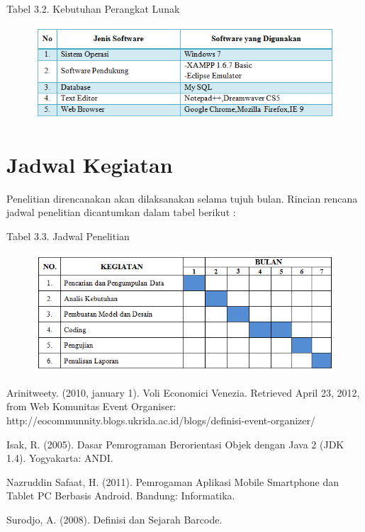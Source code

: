 \documentclass{jtetiproposalskripsi}
\begin{document}
\begin{center}
Tabel 3.2. Kebutuhan Perangkat Lunak
\end{center}
\vspace{-0.5cm}
\begin{figure}[ht!]
  \centering
    \includegraphics{gambar/software}
    \label{software}
\end{figure}

\section{Jadwal Kegiatan}
Penelitian direncanakan akan dilaksanakan selama tujuh bulan. Rincian rencana jadwal penelitian dicantumkan dalam tabel berikut :

\begin{center}
Tabel 3.3. Jadwal Penelitian
\end{center}
\vspace{-0.5cm}
\begin{figure}[ht!]
  \centering
    \includegraphics{gambar/jadwal}
    \label{jadwal}
\end{figure}


\begin{thebibliography}{9}

Arinitweety. (2010, january 1). Voli Economici Venezia. Retrieved April 23, 2012, from Web Komunitas Event Organiser: http://eocommunnity.blogs.ukrida.ac.id/blogs/definisi-event-organizer/

Isak, R. (2005). Dasar Pemrograman Berorientasi Objek dengan Java 2 (JDK 1.4). Yogyakarta: ANDI.

Nazruddin Safaat, H. (2011). Pemrogaman Aplikasi Mobile Smartphone dan Tablet PC Berbasis Android. Bandung: Informatika.

Surodjo, A. (2008). Definisi dan Sejarah Barcode.

\end{thebibliography}
\end{document}

